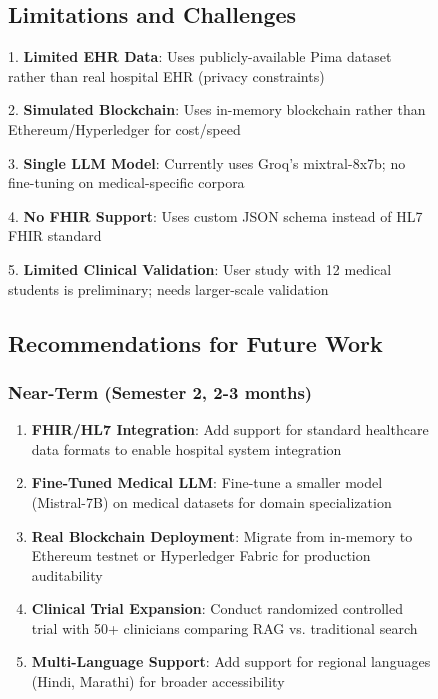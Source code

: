 \documentclass[12pt,singleside,a4paper]{article}
\begin{document}
\begin{figure}[H]
\subsection{Limitations and Challenges}

1. \textbf{Limited EHR Data}: Uses publicly-available Pima dataset rather than real hospital EHR (privacy constraints)

2. \textbf{Simulated Blockchain}: Uses in-memory blockchain rather than Ethereum/Hyperledger for cost/speed

3. \textbf{Single LLM Model}: Currently uses Groq's mixtral-8x7b; no fine-tuning on medical-specific corpora

4. \textbf{No FHIR Support}: Uses custom JSON schema instead of HL7 FHIR standard

5. \textbf{Limited Clinical Validation}: User study with 12 medical students is preliminary; needs larger-scale validation

\subsection{Recommendations for Future Work}

\subsubsection{Near-Term (Semester 2, 2-3 months)}

\begin{enumerate}
\item \textbf{FHIR/HL7 Integration}: Add support for standard healthcare data formats to enable hospital system integration

\item \textbf{Fine-Tuned Medical LLM}: Fine-tune a smaller model (Mistral-7B) on medical datasets for domain specialization

\item \textbf{Real Blockchain Deployment}: Migrate from in-memory to Ethereum testnet or Hyperledger Fabric for production auditability

\item \textbf{Clinical Trial Expansion}: Conduct randomized controlled trial with 50+ clinicians comparing RAG vs. traditional search

\item \textbf{Multi-Language Support}: Add support for regional languages (Hindi, Marathi) for broader accessibility
\end{enumerate}


\end{figure}
\end{document}
